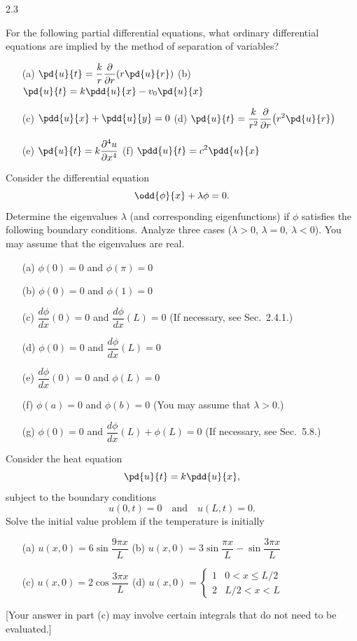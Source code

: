 \begin{exercises}{2.3}

\item For the following partial differential equations, what ordinary differential equations are implied by the method of separation of variables?
\begin{enumerate}
\item[\starred (a)] $\displaystyle\pd{u}{t} = \frac{k}{r}\frac{\partial}{\partial r}\!\left(r\pd{u}{r}\right)$
\qquad
(b) $\displaystyle\pd{u}{t} = k\pdd{u}{x} - v_0\pd{u}{x}$
\item[\starred (c)] $\displaystyle\pdd{u}{x} + \pdd{u}{y} = 0$
\qquad
(d) $\displaystyle\pd{u}{t} = \frac{k}{r^2}\frac{\partial}{\partial r}\!\left(r^2\pd{u}{r}\right)$
\item[\starred (e)] $\displaystyle\pd{u}{t} = k\frac{\partial^4 u}{\partial x^4}$
\qquad
\starred (f) $\displaystyle\pdd{u}{t} = c^2\pdd{u}{x}$
\end{enumerate}

\item Consider the differential equation
\[
\odd{\phi}{x} + \lambda\phi = 0.
\]
Determine the eigenvalues $\lambda$ (and corresponding eigenfunctions) if $\phi$ satisfies the following boundary conditions. Analyze three cases ($\lambda > 0$, $\lambda = 0$, $\lambda < 0$). You may assume that the eigenvalues are real.
\begin{enumerate}
\item[(a)] $\phi(0) = 0$ and $\phi(\pi) = 0$
\item[\starred (b)] $\phi(0) = 0$ and $\phi(1) = 0$
\item[(c)] $\dfrac{d\phi}{dx}(0) = 0$ and $\dfrac{d\phi}{dx}(L) = 0$ (If necessary, see Sec.~2.4.1.)
\item[\starred (d)] $\phi(0) = 0$ and $\dfrac{d\phi}{dx}(L) = 0$
\item[(e)] $\dfrac{d\phi}{dx}(0) = 0$ and $\phi(L) = 0$
\item[\starred (f)] $\phi(a) = 0$ and $\phi(b) = 0$ (You may assume that $\lambda > 0$.)
\item[(g)] $\phi(0) = 0$ and $\dfrac{d\phi}{dx}(L) + \phi(L) = 0$ (If necessary, see Sec.~5.8.)
\end{enumerate}

\item Consider the heat equation
\[
\pd{u}{t} = k\pdd{u}{x},
\]
subject to the boundary conditions
\[
u(0,t) = 0 \quad\text{and}\quad u(L,t) = 0.
\]
Solve the initial value problem if the temperature is initially
\begin{enumerate}
\item[(a)] $u(x,0) = 6\sin\dfrac{9\pi x}{L}$
\qquad
(b) $u(x,0) = 3\sin\dfrac{\pi x}{L} - \sin\dfrac{3\pi x}{L}$
\item[\starred (c)] $u(x,0) = 2\cos\dfrac{3\pi x}{L}$
\qquad
(d) $u(x,0) = \begin{cases} 1 & 0 < x \le L/2 \\ 2 & L/2 < x < L \end{cases}$
\end{enumerate}
[Your answer in part (c) may involve certain integrals that do not need to be evaluated.]


\end{exercises}
